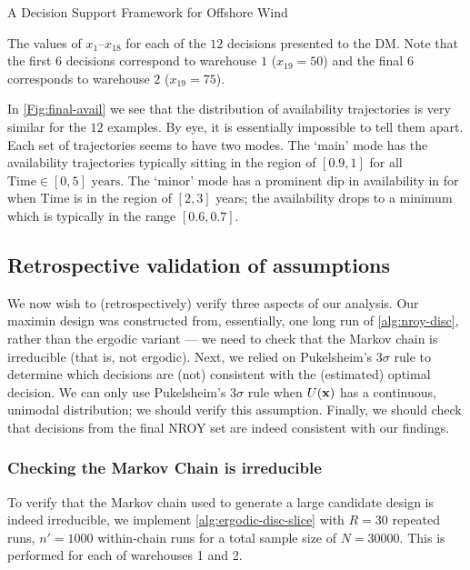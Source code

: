 \begin{chapter}{A Decision Support Framework for Offshore Wind \label{Ch:ds-for-ow}}
\begin{figure}
\end{figure}
\begin{table}
\centering
{}
\caption{The values of $x_1$--$x_{18}$ for each of the $12$ decisions presented to the DM. Note that the first $6$ decisions correspond to warehouse $1$ ($x_{19} = 50$) and the final $6$ corresponds to warehouse $2$ ($x_{19} = 75$).\label{Tab:final-dec}}
\end{table}
In \cref{Fig:final-avail} we see that the distribution of availability trajectories is very similar for the $12$ examples. By eye, it is essentially impossible to tell them apart. Each set of trajectories seems to have two modes. The `main' mode has the availability trajectories typically sitting in the region of $[0.9,1]$ for all $\text{Time} \in [0,5] \text{ years}$. The `minor' mode has a prominent dip in availability in for when Time is in the region of $[2,3]$ years; the availability drops to a minimum which is typically in the range $[0.6, 0.7]$.
\subsection{Retrospective validation of assumptions}
We now wish to (retrospectively) verify three aspects of our analysis. Our maximin design was constructed from, essentially, one long run of \cref{alg:nroy-disc}, rather than the ergodic variant --- we need to check that the Markov chain is irreducible (that is, not ergodic). Next, we relied on Pukelsheim's $3\sigma$ rule to determine which decisions are (not) consistent with the (estimated) optimal decision. We can only use Pukelsheim's $3\sigma$ rule when $U(\mathbf{x})$ has a continuous, unimodal distribution; we should verify this assumption. Finally, we should check that decisions from the final NROY set are indeed consistent with our findings.

\subsubsection{Checking the Markov Chain is irreducible}

To verify that the Markov chain used to generate a large candidate design is indeed irreducible, we implement \cref{alg:ergodic-disc-slice} with $R=30$ repeated runs, $n' = 1000$ within-chain runs for a total sample size of $N = 30000$. This is performed for each of warehouses 1 and 2.


\end{chapter}
